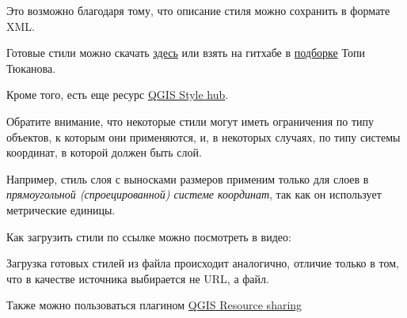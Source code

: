 \documentclass[
  russian,
  letterpaper,
  DIV=11,
  numbers=noendperiod]{scrartcl}
\begin{document}
Это возможно благодаря тому, что описание стиля можно сохранить в
формате XML.

Готовые стили можно скачать
\href{https://plugins.qgis.org/styles/}{здесь} или взять на гитхабе в
\href{https://github.com/tjukanovt/qgis_styles}{подборке} Топи Тюканова.

Кроме того, есть еще ресурс
\href{http://qgis-hub.fast-page.org/styles.php}{QGIS Style hub}.

\begin{tcolorbox}[enhanced jigsaw, arc=.35mm, bottomrule=.15mm, bottomtitle=1mm, breakable, colback=white, colbacktitle=quarto-callout-caution-color!10!white, colframe=quarto-callout-caution-color-frame, coltitle=black, left=2mm, leftrule=.75mm, opacityback=0, opacitybacktitle=0.6, rightrule=.15mm, title=\textcolor{quarto-callout-caution-color}{\faFire}\hspace{0.5em}{Предупреждение}, titlerule=0mm, toprule=.15mm, toptitle=1mm]

Обратите внимание, что некоторые стили могут иметь ограничения по типу
объектов, к которым они применяются, и, в некоторых случаях, по типу
системы координат, в которой должен быть слой.

Например, стиль слоя с выносками размеров применим только для слоев в
\emph{прямоугольной (спроецированной) системе координат}, так как он
использует метрические единицы.

\end{tcolorbox}

Как загрузить стили по ссылке можно посмотреть в видео:

Загрузка готовых стилей из файла происходит аналогично, отличие только в
том, что в качестве источника выбирается не URL, а файл.

Также можно пользоваться плагином
\href{https://plugins.qgis.org/plugins/qgis_resource_sharing/}{QGIS
Resource sharing}
\end{document}
